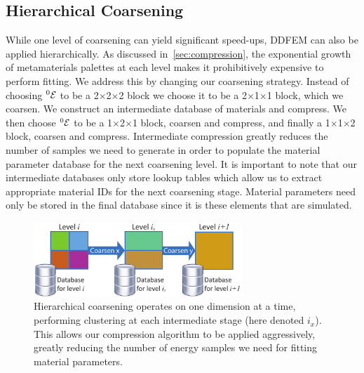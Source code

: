 \subsection{Hierarchical Coarsening}
While one level of coarsening can yield significant speed-ups, DDFEM can also be applied hierarchically.
As discussed in~\autoref{sec:compression}, the exponential growth of metamaterials palettes at each level makes it prohibitively expensive to perform fitting.
We address this by changing our coarsening strategy. 
Instead of choosing $^0\mathcal{E}$ to be a 2$\times$2$\times$2 block we choose it to be a 2$\times$1$\times$1 block, which we coarsen. We construct an intermediate database of materials and compress. 
We then choose $^0\mathcal{E}$ to be a 1$\times$2$\times$1 block, coarsen and compress, and finally a 1$\times$1$\times$2 block, coarsen and compress. Intermediate compression greatly reduces the number of samples we need to generate in order to populate the material parameter database for the next coarsening level. 
It is important to note that our intermediate databases only store lookup tables which allow us to extract appropriate material IDs for the next coarsening stage. Material parameters need only be stored in the final database since it is these elements that are simulated.
\begin{figure}
	\centering
	\includegraphics[width=0.7\textwidth]{images/hierchical}
	\caption{Hierarchical coarsening operates on one dimension at a time, performing clustering at each intermediate stage (here denoted $i_x$). This allows our compression algorithm to be applied aggressively, greatly reducing the number of energy samples we need for fitting material parameters. }
	\label{fig:hierarchy}
\end{figure}
